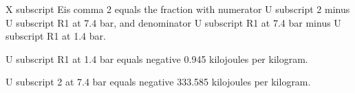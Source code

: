 X subscript Eis comma 2 equals the fraction with numerator U subscript 2 minus U subscript R1 at 7.4 bar, and denominator U subscript R1 at 7.4 bar minus U subscript R1 at 1.4 bar.

U subscript R1 at 1.4 bar equals negative 0.945 kilojoules per kilogram.

U subscript 2 at 7.4 bar equals negative 333.585 kilojoules per kilogram.
